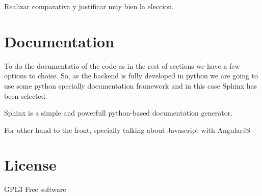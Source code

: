 Realizar comparativa y justificar muy bien la eleccion.

\section{Documentation}

To do the documentatio of the code as in the rest of sections we have a few options
to choise. So, as the backend is fully developed in python we are going to use some python
specially documentation framework and in this case Sphinx has been selected.

Sphinx is a simple and powerfull python-based documentation generator.

For other hand to the front, specially talking about Javascript with AngularJS


\section{License}

GPL3 Free software
